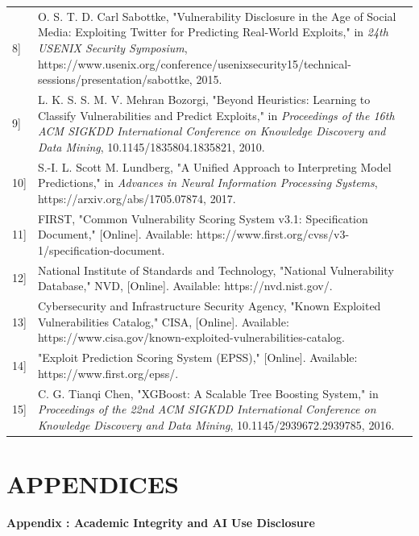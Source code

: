 \documentclass[
]{article}
\begin{document}
\begin{longtable}[]{@{}
  >{\raggedright\arraybackslash}p{}
  >{\raggedright\arraybackslash}p{}@{}}
{[}8{]} & O. S. T. D. Carl Sabottke, "Vulnerability Disclosure in the
Age of Social Media: Exploiting Twitter for Predicting Real-World
Exploits," in \emph{24th USENIX Security Symposium},
https://www.usenix.org/conference/usenixsecurity15/technical-sessions/presentation/sabottke,
2015. \\
{[}9{]} & L. K. S. S. M. V. Mehran Bozorgi, "Beyond Heuristics: Learning
to Classify Vulnerabilities and Predict Exploits," in \emph{Proceedings
of the 16th ACM SIGKDD International Conference on Knowledge Discovery
and Data Mining}, 10.1145/1835804.1835821, 2010. \\
{[}10{]} & S.-I. L. Scott M. Lundberg, "A Unified Approach to
Interpreting Model Predictions," in \emph{Advances in Neural Information
Processing Systems}, https://arxiv.org/abs/1705.07874, 2017. \\
{[}11{]} & FIRST, "Common Vulnerability Scoring System v3.1:
Specification Document," {[}Online{]}. Available:
https://www.first.org/cvss/v3-1/specification-document. \\
{[}12{]} & National Institute of Standards and Technology, "National
Vulnerability Database," NVD, {[}Online{]}. Available:
https://nvd.nist.gov/. \\
{[}13{]} & Cybersecurity and Infrastructure Security Agency, "Known
Exploited Vulnerabilities Catalog," CISA, {[}Online{]}. Available:
https://www.cisa.gov/known-exploited-vulnerabilities-catalog. \\
{[}14{]} & "Exploit Prediction Scoring System (EPSS)," {[}Online{]}.
Available: https://www.first.org/epss/. \\
{[}15{]} & C. G. Tianqi Chen, "XGBoost: A Scalable Tree Boosting
System," in \emph{Proceedings of the 22nd ACM SIGKDD International
Conference on Knowledge Discovery and Data Mining},
10.1145/2939672.2939785, 2016. \\
\bottomrule()
\end{longtable}

\hypertarget{section-2}{%
\section{}\label{section-2}}

\hypertarget{appendices}{%
\section{APPENDICES}\label{appendices}}

\textbf{Appendix : Academic Integrity and AI Use Disclosure}
\end{document}
